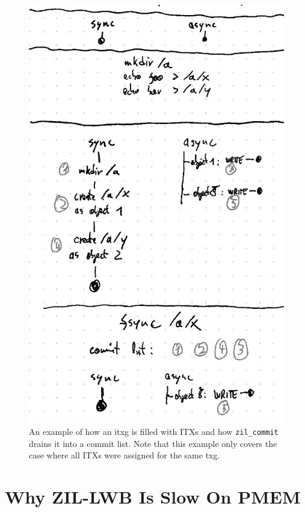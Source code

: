 \documentclass[12pt,a4paper,twoside]{book}
\begin{document}
\begin{figure}[h]
    \includegraphics[height=0.5\textheight]{fig/zil_single_itxg_example}
    \caption{
        An example of how an itxg is filled with ITXs and how \lstinline{zil_commit} drains it into a commit list.
        Note that this example only covers the case where all ITXs were assigned for the same txg.
    }
    \label{fig:zil_per_itxg_state_example}
\end{figure}


\chapter{Why ZIL-LWB Is Slow On PMEM}\label{ch:lwb_analysis}
\blindtext{}
\end{document}

